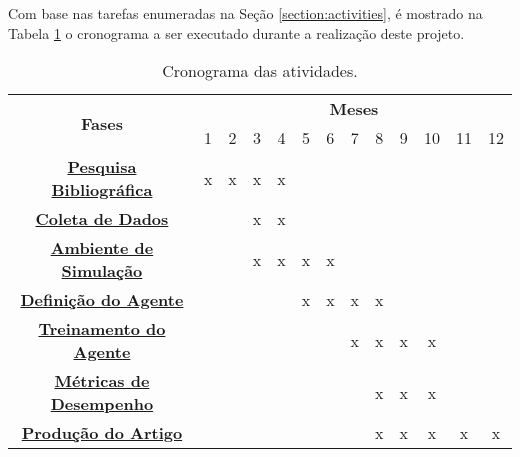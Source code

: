 
Com base nas tarefas enumeradas na Seção \ref{section:activities}, é mostrado na Tabela \ref{tab:chronogram} o cronograma a ser executado durante a realização deste projeto.

\begin{table}[ht]
\centering
\caption{Cronograma das atividades.}
\begin{tabular}{|c|c|c|c|c|c|c|c|c|c|c|c|c|}
\hline
\multirow{2}{*}{{\bf Fases}} & \multicolumn{12}{c|}{{\bf Meses}}
\\ \cline{2-13}
    & 1 & 2 & 3 & 4 & 5 & 6 & 7 & 8 & 9 & 10 & 11 & 12
\\ \hline
    {\bf \hyperref[item:bibliography_review]{Pesquisa Bibliográfica} } 
    & x & x & x & x & & & & & & & &
\\ \hline
    {\bf \hyperref[item:data]{Coleta de Dados}} 
    &  &  & x & x & & & & & & & &
\\ \hline
    {\bf \hyperref[item:environment]{Ambiente de Simulação}} 
    &  &  & x & x & x & x &  & & & & &
\\ \hline
    {\bf \hyperref[item:agent]{Definição do Agente}} 
    &  &  &  &  & x & x & x & x &  &  &  & 
\\ \hline
    {\bf \hyperref[item:training]{Treinamento do Agente}} 
    & & & & & & & x & x & x & x & & 
\\ \hline
    {\bf \hyperref[item:evaluation]{Métricas de Desempenho}} 
    &  &  &  &  &  &  &  & x & x & x & & 
\\ \hline
    {\bf \hyperref[item:publishing]{Produção do Artigo}} 
    & & & & & & & & x & x & x & x & x
\\ \hline
\end{tabular}
\label{tab:chronogram}
\end{table}
%